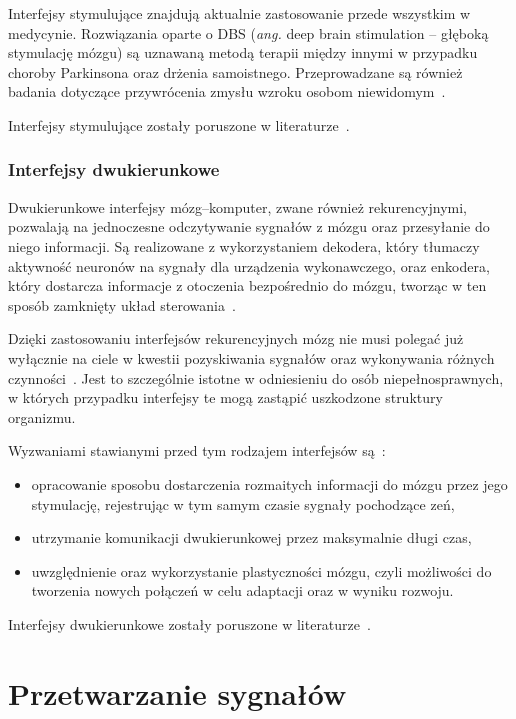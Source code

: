 \documentclass[skorowidz,skroty]{dyplomWEZUT}
\begin{document}
Interfejsy stymulujące znajdują aktualnie zastosowanie przede wszystkim w medycynie. Rozwiązania oparte o DBS (\textit{ang.} deep brain stimulation -- głęboką stymulację mózgu) są uznawaną metodą terapii między innymi w przypadku choroby Parkinsona oraz drżenia samoistnego. Przeprowadzane są również badania dotyczące przywrócenia zmysłu wzroku osobom niewidomym~\cite{bci_introduction}.

Interfejsy stymulujące zostały poruszone w literaturze~\cite{bci_introduction,bci_stimulate1,bci_stimulate2}.

\subsubsection{Interfejsy dwukierunkowe}
Dwukierunkowe interfejsy mózg--komputer, zwane również rekurencyjnymi, pozwalają na jednoczesne odczytywanie sygnałów z mózgu oraz przesyłanie do niego informacji. Są realizowane z wykorzystaniem dekodera, który tłumaczy aktywność neuronów na sygnały dla urządzenia wykonawczego, oraz enkodera, który dostarcza informacje z otoczenia bezpośrednio do mózgu, tworząc w ten sposób zamknięty układ sterowania~\cite{bci_bidir1}.

Dzięki zastosowaniu interfejsów rekurencyjnych mózg nie musi polegać już wyłącznie na ciele w kwestii pozyskiwania sygnałów oraz wykonywania różnych czynności~\cite{bci_introduction}. Jest to szczególnie istotne w odniesieniu do osób niepełnosprawnych, w których przypadku interfejsy te mogą zastąpić uszkodzone struktury organizmu.

Wyzwaniami stawianymi przed tym rodzajem interfejsów są~\cite{bci_introduction}:
\begin{itemize}
    \item opracowanie sposobu dostarczenia rozmaitych informacji do mózgu przez jego stymulację, rejestrując w tym samym czasie sygnały pochodzące zeń,
    \item utrzymanie komunikacji dwukierunkowej przez maksymalnie długi czas,
    \item uwzględnienie oraz wykorzystanie plastyczności mózgu, czyli możliwości do tworzenia nowych połączeń w celu adaptacji oraz w wyniku rozwoju.
\end{itemize}

Interfejsy dwukierunkowe zostały poruszone w literaturze~\cite{bci_introduction,bci_bidir1,bci_bidir2}.


\section{Przetwarzanie sygnałów}
\end{document}
